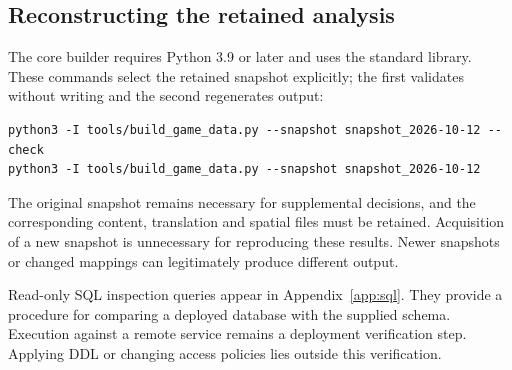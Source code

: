 \documentclass[10pt,a4paper]{article}
\begin{document}
\subsection{Reconstructing the retained analysis}
The core builder requires Python 3.9 or later and uses the standard library. These commands select the retained snapshot explicitly; the first validates without writing and the second regenerates output:
\begin{lstlisting}
python3 -I tools/build_game_data.py --snapshot snapshot_2026-10-12 --check
python3 -I tools/build_game_data.py --snapshot snapshot_2026-10-12
\end{lstlisting}
The original snapshot remains necessary for supplemental decisions, and the corresponding content, translation and spatial files must be retained. Acquisition of a new snapshot is unnecessary for reproducing these results. Newer snapshots or changed mappings can legitimately produce different output.

Read-only SQL inspection queries appear in Appendix~\ref{app:sql}. They provide a procedure for comparing a deployed database with the supplied schema. Execution against a remote service remains a deployment verification step. Applying DDL or changing access policies lies outside this verification.


\end{document}
